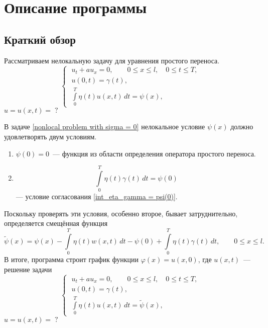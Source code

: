 \documentclass{article}
\renewcommand{\le}{\leqslant}
\theoremstyle{definition}
\begin{document}
\newpage

\section{Описание программы}

\subsection{Краткий обзор}
Рассматриваем нелокальную задачу для уравнения простого переноса.
\begin{equation} \label{nonlocal problem with sigma = 0}
\begin{cases}
	\; u_t + au_x = 0, \qquad 0 \le x \le l, \quad 0 \le t \le T, \\[3mm]
	\; u(0,t) = \gamma(t), \\[1mm]
	\; \int\limits_{0}^{T} \eta(t) u(x,t)\,dt = \psi(x),
\end{cases}
\end{equation}
$u = u(x,t) = \;?$

В задаче \eqref{nonlocal problem with sigma = 0} нелокальное условие $\psi(x)$ должно удовлетворять двум условиям.
\begin{enumerate}
	\item $\psi(0) = 0$~--- функция из области определения оператора простого \mbox{переноса}.
	\item 
	\begin{equation*}
		\int\limits_{0}^{T} \eta(t) \gamma(t)\,dt = \psi(0) 
	\end{equation*}
	--- условие согласования \eqref{int_eta_gamma = psi(0)}.
\end{enumerate}
Поскольку проверять эти условия, особенно второе, бывает затруднительно, определяется смещённая функция 
\begin{equation} \label{tilde_psi}
	\widetilde{\psi}(x) = \psi(x) - \int\limits_0^T \eta(t)w(x,t) \,dt - \psi(0) + \int\limits_0^T \eta(t)\gamma(t) \,dt,
	\qquad 0 \le x \le l.
\end{equation}
В итоге, программа строит график функции $\varphi(x) = u(x,0)$, где $u(x,t)$~--- решение задачи
\begin{equation} \label{nonlocal problem with tilde_psi}
\begin{cases}
	\; u_t + au_x = 0, \qquad 0 \le x \le l, \quad 0 \le t \le T, \\[3mm]
	\; u(0,t) = \gamma(t), \\[1mm]
	\; \int\limits_{0}^{T} \eta(t) u(x,t)\,dt = \widetilde{\psi}(x),
\end{cases}
\end{equation}
$u = u(x,t) = \;?$
\end{document}
